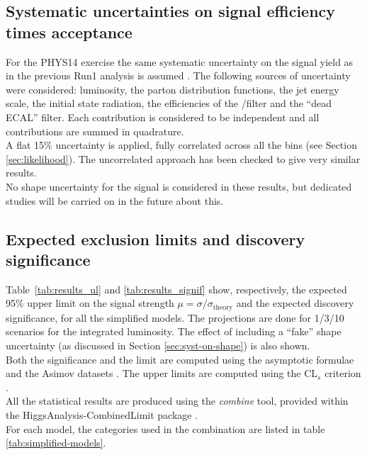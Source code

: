 \subsection{Systematic uncertainties on signal efficiency times acceptance}
\label{sec:sig-syst}

For the PHYS14 exercise the same systematic uncertainty on the signal yield 
as in the previous Run1 analysis is assumed \cite{CMS_AN_2013-366}. 
The following sources of uncertainty were considered: 
luminosity, the parton distribution
functions, the jet energy scale, the initial state radiation, the
efficiencies of the \mht/\met filter and the ``dead ECAL'' filter. 
Each contribution is considered to be independent and all contributions are
summed in quadrature. \\
A flat 15\% uncertainty is applied, fully correlated across all the bins (see Section \ref{sec:likelihood}). 
The uncorrelated approach has been checked to give very similar results. \\
No shape uncertainty for the signal is considered in these results, 
but dedicated studies will be carried on in the future about this.


\subsection{Expected exclusion limits and discovery significance}
\label{subsec:susy_results}

Table~\ref{tab:results_ul} and \ref{tab:results_signif} show, respectively, 
the expected 95\% upper limit on the signal strength $\mu=\sigma/\sigma_{\mathrm{theory}}$ 
and the expected discovery significance, for all the simplified models. 
The projections are done for 1/3/10 \ifb scenarios for the integrated luminosity. 
The effect of including a ``fake'' shape uncertainty (as discussed in Section \ref{sec:syst-on-shape}) is also shown. \\

Both the significance and the limit are computed using the asymptotic formulae and the Asimov datasets \cite{AsymptoticFormulae}. 
The upper limits are computed using the $\text{CL}_{s}$ criterion \cite{CLsTechnique}. \\
All the statistical results are produced using the \textit{combine} tool, 
provided within the HiggsAnalysis-CombinedLimit package \cite{Combine}. \\
For each model, the categories used in the combination are listed in table \ref{tab:simplified-models}. 

